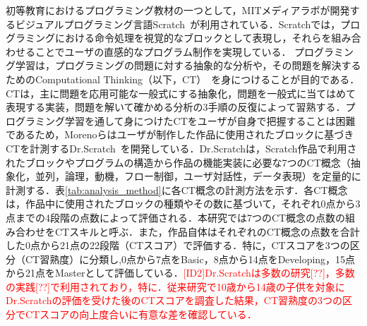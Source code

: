 \documentclass[submit,ses,noauthor]{ipsj}
\begin{document}
初等教育におけるプログラミング教材の一つとして，MITメディアラボが開発するビジュアルプログラミング言語Scratch~\cite{Resnick_2009}が利用されている．Scratchでは，プログラミングにおける命令処理を視覚的なブロックとして表現し，それらを組み合わせることでユーザの直感的なプログラム制作を実現している．
プログラミング学習は，プログラミングの問題に対する抽象的な分析や，その問題を解決するためのComputational Thinking（以下，CT）~\cite{Wing_2006}を身につけることが目的である．CTは，主に問題を応用可能な一般式にする抽象化，問題を一般式に当てはめて表現する実装，問題を解いて確かめる分析の3手順の反復によって習熟する．プログラミング学習を通して身につけたCTをユーザが自身で把握することは困難であるため，Morenoらはユーザが制作した作品に使用されたブロックに基づきCTを計測するDr.Scratch~\cite{Moreno_2015}を開発している．Dr.Scratchは，Scratch作品で利用されたブロックやプログラムの構造から作品の機能実装に必要な7つのCT概念（抽象化，並列，論理，動機，フロー制御，ユーザ対話性，データ表現）を定量的に計測する．表\ref{tab:analysis_method}に各CT概念の計測方法を示す．各CT概念は，作品中に使用されたブロックの種類やその数に基づいて，それぞれ0点から3点までの4段階の点数によって評価される．本研究では7つのCT概念の点数の組み合わせをCTスキルと呼ぶ．また，作品自体はそれぞれのCT概念の点数を合計した0点から21点の22段階（CTスコア）で評価する．特に，CTスコアを3つの区分（CT習熟度）に分類し,0点から7点をBasic，8点から14点をDeveloping，15点から21点をMasterとして評価している．\textcolor{red}{[ID2]Dr.Scratchは多数の研究[??]，多数の実践[??]で利用されており，特に．従来研究で10歳から14歳の子供を対象にDr.Scratchの評価を受けた後のCTスコアを調査した結果，CT習熟度の3つの区分でCTスコアの向上度合いに有意な差を確認している．}
\end{document}
